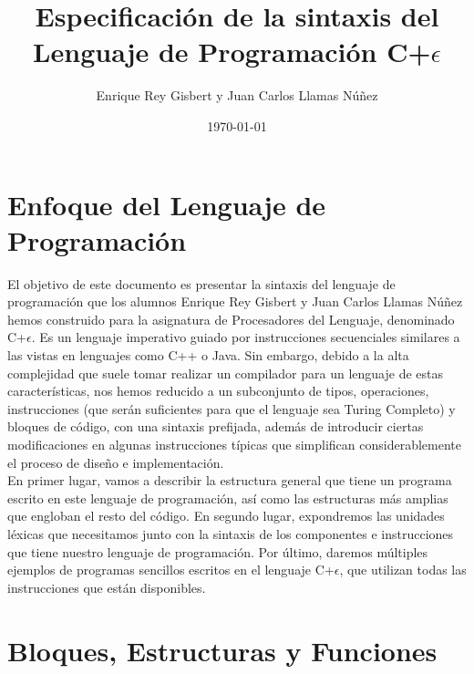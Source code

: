 \documentclass[12pt,onecolumn]{article}
\title{Especificación de la sintaxis del Lenguaje de Programación C+$\epsilon$}
\author{Enrique Rey Gisbert y Juan Carlos Llamas Núñez}
\date{\today}
\begin{document}

	\maketitle
	
	\titlespacing{\section}{0pt}{20pt}{20pt}
	
	\newpage
	
	\section{Enfoque del Lenguaje de Programación} 
	
	El objetivo de este documento es presentar la sintaxis del lenguaje de programación que los alumnos Enrique Rey Gisbert y Juan Carlos Llamas Núñez hemos construido para la asignatura de Procesadores del Lenguaje, denominado C+$\epsilon$. Es un lenguaje imperativo guiado por instrucciones secuenciales similares a las vistas en lenguajes como C++ o Java. Sin embargo, debido a la alta complejidad que suele tomar realizar un compilador para un lenguaje de estas características, nos hemos reducido a un subconjunto de tipos, operaciones, instrucciones (que serán suficientes para que el lenguaje sea Turing Completo) y bloques de código, con una sintaxis prefijada, además de introducir ciertas modificaciones en algunas instrucciones típicas que simplifican considerablemente el proceso de diseño e implementación. \\
	
	En primer lugar, vamos a describir la estructura general que tiene un programa escrito en este lenguaje de programación, así como las estructuras más amplias que engloban el resto del código. En segundo lugar, expondremos las unidades léxicas que necesitamos junto con la sintaxis de los componentes e instrucciones que tiene nuestro lenguaje de programación. Por último, daremos múltiples ejemplos de programas sencillos escritos en el lenguaje C+$\epsilon$, que utilizan todas las instrucciones que están disponibles. 
	
	\section{Bloques, Estructuras y Funciones}
	
\end{document}
